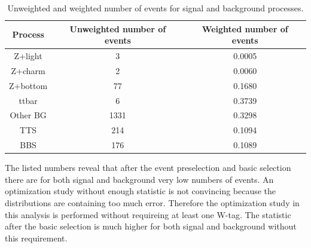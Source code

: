 \begin{table}
\centering
\begin{tabular}{|c|c|c|} 
\hline
\textbf{Process} & \textbf{Unweighted number of events} & \textbf{Weighted number of events}  \\
\hline
\hline
Z+light & 3 & 0.0005\\
Z+charm & 2 & 0.0060\\
Z+bottom & 77 & 0.1680\\
ttbar & 6 & 0.3739\\
Other BG & 1331 & 0.3298\\
TTS & 214 & 0.1094\\
BBS & 176 & 0.1089\\
\hline
\end{tabular}
\caption{Unweighted and weighted number of events for signal and background processes.}
\label{numberoevents}
\end{table}


The listed numbers reveal that after the event preselection and basic selection there are for both signal and background very  low numbers of events.
An optimization study without enough statistic is not convincing because the distributions are containing too much error.
Therefore the optimization study in this analysis is performed without requireing at least one W-tag.
The statistic after the basic selection is much higher for both signal and background without this requirement.

 


















